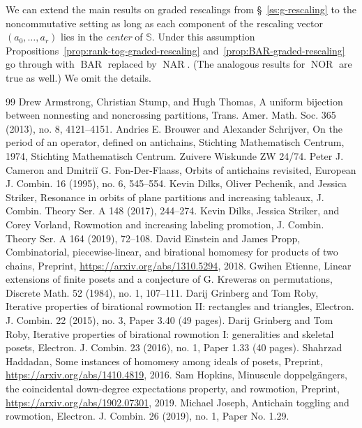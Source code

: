 \documentclass[10pt]{amsart}
\theoremstyle{definition}
\newcommand{\bbs}{\mathbb{S}}
\DeclareMathOperator{\BAR}{BAR}
\DeclareMathOperator{\NAR}{NAR}
\DeclareMathOperator{\NOR}{NOR}
\begin{document}
We can extend the main results on graded rescalings from \S~\ref{ss:g-rescaling} to the
noncommutative setting as long as each component of the rescaling vector $(a_{0},\dots ,a_{r})$
lies in the \emph{center} of $\bbs$. Under this assumption
Propositions~\ref{prop:rank-tog-graded-rescaling} and~\ref{prop:BAR-graded-rescaling} go
through with $\BAR$ replaced by $\NAR$. (The analogous results for $\NOR$ are true as well.)
We omit the details. 
\begin{thebibliography}{99}
 Drew Armstrong, Christian Stump, and Hugh Thomas, A uniform bijection between nonnesting and noncrossing partitions, Trans. Amer. Math. Soc. 365 (2013), no. 8, 4121--4151.
 Andries E. Brouwer and Alexander Schrijver, On the period of an operator, defined on antichains, Stichting Mathematisch Centrum, 1974, Stichting Mathematisch Centrum. Zuivere Wiskunde ZW 24/74.
 Peter J. Cameron and Dmitriĭ G. Fon-Der-Flaass, Orbits of antichains revisited, European J. Combin. 16 (1995), no. 6, 545--554.
 Kevin Dilks, Oliver Pechenik, and Jessica Striker, Resonance in orbits of plane partitions and increasing tableaux, J. Combin. Theory Ser. A 148 (2017), 244--274.
 Kevin Dilks, Jessica Striker, and Corey Vorland, Rowmotion and increasing labeling promotion, J. Combin. Theory Ser. A 164 (2019), 72--108.
 David Einstein and James Propp, Combinatorial, piecewise-linear, and birational homomesy for products of two chains, Preprint, \url{https://arxiv.org/abs/1310.5294}, 2018.
 Gwihen Etienne, Linear extensions of finite posets and a conjecture of G. Kreweras on permutations, Discrete Math. 52 (1984), no. 1, 107--111.
 Darij Grinberg and Tom Roby, Iterative properties of birational rowmotion II: rectangles and triangles, Electron. J. Combin. 22 (2015), no. 3, Paper 3.40 (49 pages).
 Darij Grinberg and Tom Roby, Iterative properties of birational rowmotion I: generalities and skeletal posets, Electron. J. Combin. 23 (2016), no. 1, Paper 1.33 (40 pages).
 Shahrzad Haddadan, Some instances of homomesy among ideals of posets, Preprint, \url{https://arxiv.org/abs/1410.4819}, 2016.
 Sam Hopkins, Minuscule doppelgängers, the coincidental down-degree expectations property, and rowmotion, Preprint, \url{https://arxiv.org/abs/1902.07301}, 2019.
 Michael Joseph, Antichain toggling and rowmotion, Electron. J. Combin. 26 (2019), no. 1, Paper No. 1.29.

\end{thebibliography}
\end{document}
